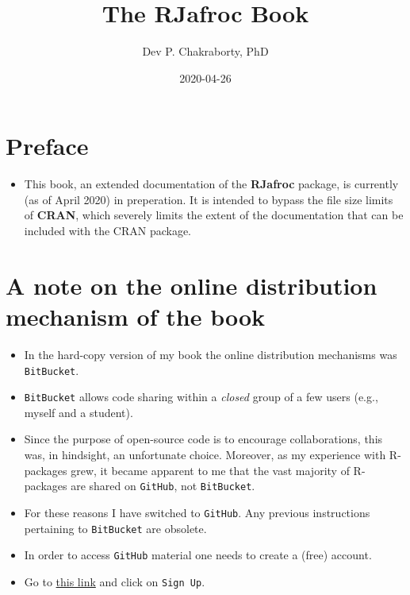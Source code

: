 \documentclass[
]{book}
\title{The RJafroc Book}
\author{Dev P. Chakraborty, PhD}
\date{2020-04-26}
\providecommand{\tightlist}{%
  \setlength{\itemsep}{0pt}\setlength{\parskip}{0pt}}
\begin{document}
\maketitle

{
\setcounter{tocdepth}{1}
\tableofcontents
}
\hypertarget{preface}{%
\chapter*{Preface}\label{preface}}

\begin{itemize}
\tightlist
\item
  This book, an extended documentation of the \textbf{RJafroc} package, is currently (as of April 2020) in preperation. It is intended to bypass the file size limits of \textbf{CRAN}, which severely limits the extent of the documentation that can be included with the CRAN package.
\end{itemize}

\hypertarget{a-note-on-the-online-distribution-mechanism-of-the-book}{%
\chapter*{A note on the online distribution mechanism of the book}\label{a-note-on-the-online-distribution-mechanism-of-the-book}}

\begin{itemize}
\tightlist
\item
  In the hard-copy version of my book \citep{RN2680} the online distribution mechanisms was \texttt{BitBucket}.
\item
  \texttt{BitBucket} allows code sharing within a \emph{closed} group of a few users (e.g., myself and a student).
\item
  Since the purpose of open-source code is to encourage collaborations, this was, in hindsight, an unfortunate choice. Moreover, as my experience with R-packages grew, it became apparent to me that the vast majority of R-packages are shared on \texttt{GitHub}, not \texttt{BitBucket}.
\item
  For these reasons I have switched to \texttt{GitHub}. Any previous instructions pertaining to \texttt{BitBucket} are obsolete.
\item
  In order to access \texttt{GitHub} material one needs to create a (free) account.
\item
  Go to \href{https://github.com}{this link} and click on \texttt{Sign\ Up}.
\end{itemize}
\end{document}
